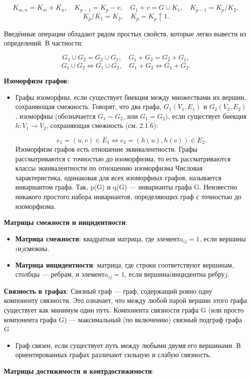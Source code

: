 \documentclass[
]{article}
\providecommand{\tightlist}{%
  \setlength{\itemsep}{0pt}\setlength{\parskip}{0pt}}
\begin{document}
\begin{enumerate}
{{{{{\[
K_{m,n} = \overline{K_m} + \overline{K_n}, \quad K_{p-1} = K_p - v, \quad G_1 + v = G \cup K_1, \quad K_{p-1} = K_p / K_2,
\]
\[
K_p / K_1 = K_2, \quad K_p = K_p \uparrow 1.
\]

Введённые операции обладают рядом простых свойств, которые легко вывести из определений. В частности:

\[
G_1 \cup G_2 = G_2 \cup G_1, \quad G_1 + G_2 = G_2 + G_1,
\]
\[
G_1 \cup G_2 \Leftrightarrow \overline{G_1} \cup \overline{G_2}, \quad G_1 + G_2 \Leftrightarrow \overline{G_1} + \overline{G_2}.
\]
\item
  \textbf{Изоморфизм графов}:

  \begin{itemize}
  \tightlist
  \item
    Графы изоморфны, если 
существует биекция между множествами их вершин, сохраняющая смежность.
Говорят, что два графа, $G_1(V_1, E_1)$ и $G_2(V_2, E_2)$, изоморфны (обозначается $G_1 \sim G_2$, или $G_1 = G_2$), если существует биекция $h: V_1 \rightarrow V_2$, сохраняющая смежность (см. 2.1.6):

\[
e_1 = (u, v) \in E_1 \iff e_2 = (h(u), h(v)) \in E_2.
\]
Изоморфизм графов есть отношение эквивалентности.
Графы рассматриваются с точностью до изоморфизма, то есть рассматриваются
классы эквивалентности по отношению изоморфизма
Числовая характеристика, одинаковая для всех изоморфных графов, называется инвариантом графа. Так, p(G) и q(G) — инварианты графа G. Неизвестно никакого простого набора инвариантов, определяющих граф с точностью до
изоморфизма.
  \end{itemize}



\item
  \textbf{Матрицы смежности и инцидентности}:

  \begin{itemize}
  \tightlist
  \item
    \textbf{Матрица смежности}: квадратная матрица, где
    элемент\(a_{ij} = 1\), если вершины\(i\)и\(j\)смежны.
  \item
    \textbf{Матрица инцидентности}: матрица, где строки соответствуют
    вершинам, столбцы --- ребрам, и элемент\(a_{ij} = 1\), если
    вершина\(i\)инцидентна ребру\(j\).
  \end{itemize}
\item
  \textbf{Связность в графах}:
Связный граф — граф, содержащий ровно одну компоненту связности. Это означает, что между любой парой вершин этого графа существует как минимум один путь. 
Компонента связности графа  G  (или просто компонента графа  G) — максимальный (по включению) связный подграф графа G
  \begin{itemize}
  \tightlist
  \item
    Граф связен, если существует путь между любыми двумя его вершинами.
    В ориентированных графах различают сильную и слабую связность.
  \end{itemize}
\item
  \textbf{Матрицы достижимости и контрдостижимости}:

}}}}}
\end{enumerate}
\end{document}
